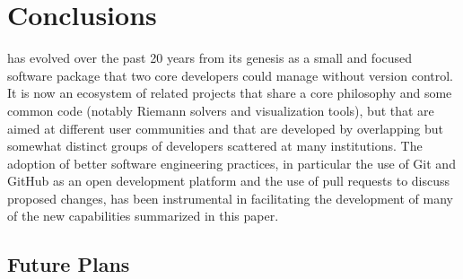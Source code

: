 %
%
%

\section{Conclusions} \label{sec:conclusions}

\clawpack has evolved over the past 20 years from its genesis as a small and
focused software package that two core developers could manage without
version control.  It is now an ecosystem of related projects that share a core
philosophy and some common code (notably Riemann solvers and visualization
tools), but that are aimed at different user
communities and that are developed by overlapping but somewhat distinct
groups of developers scattered at many institutions.  The adoption of better
software engineering practices, in particular the use of Git and GitHub as an
open development platform and the use of pull requests to discuss proposed
changes, has been instrumental in facilitating the development of many of the
new capabilities summarized in this paper.  

\subsection{Future Plans} \label{sub:future}

